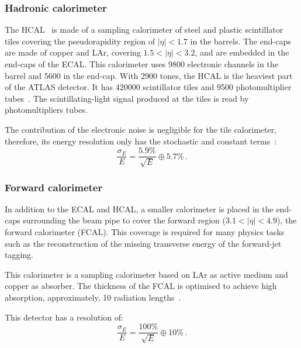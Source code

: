 \subsubsection{Hadronic calorimeter}
\label{sec:Chap2:CALO:HCAL}
The HCAL~\cite{Cavallari_2011} is made of a sampling calorimeter of steel and plastic 
scintillator tiles covering the pseudorapidity region of $|\eta|<1.7$ in the barrels. The end-caps 
are made of copper and LAr, covering $1.5<|\eta|<3.2$, and are embedded in the end-caps of the ECAL.
 This calorimeter uses 9800 electronic channels in the barrel and 5600 in the end-cap. With 2900 tones, the HCAL is the heaviest part
 of the ATLAS detector. It has 420000 scintillator tiles and 9500 photomultiplier tubes~\cite{ATLAS_Web_Detectors}.
 The scintillating-light signal produced at the tiles is read by photomultipliers tubes. 
 
 The contribution of the electronic noise is negligible for the tile calorimeter, therefore, its energy resolution only has
 the stochastic and constant terms~\cite{Cavallari_2011}:
 \begin{equation*}
	\frac{\sigma_E}{E}=  \frac{5.9\%}{\sqrt{E}} \oplus 5.7 \% \, .
\end{equation*}




\subsubsection{Forward calorimeter}
In addition to the ECAL and HCAL, a smaller calorimeter is placed in the end-caps surrounding 
the beam pipe to cover the forward region ($3.1<|\eta|<4.9$), the forward calorimeter (FCAL). 
This coverage is required for many physics tasks such as the reconstruction of the 
missing transverse energy of the forward-jet tagging.

This calorimeter is a sampling calorimeter based on LAr as active medium and copper as absorber. 
The thickness of the FCAL is optimised to achieve high absorption, approximately, 10 radiation lengths~\cite{CERN-LHCC-96-041}. %

This detector has a resolution of:
 \begin{equation*}
	\frac{\sigma_E}{E}=  \frac{100\%}{\sqrt{E}} \oplus 10 \% \,.
\end{equation*}



